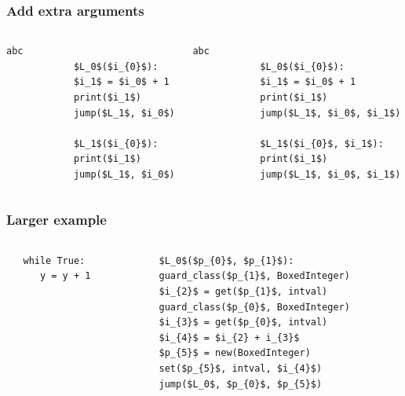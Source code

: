 \documentclass[utf8x]{beamer}
\begin{document}
\begin{frame}[fragile]
  \frametitle{Add extra arguments}
    \begin{columns}
    \begin{column}{0.5\textwidth}
      \centering
            \begin{lstlisting}[mathescape]%,numbers = right,basicstyle=\setstretch{1.05}\ttfamily\scriptsize]
            abc
            $L_0$($i_{0}$):
            $i_1$ = $i_0$ + 1
            print($i_1$)
            jump($L_1$, $i_0$)

            $L_1$($i_{0}$):
            print($i_1$)
            jump($L_1$, $i_0$)
            \end{lstlisting}
    \end{column}
    \pause
    \begin{column}{0.5\textwidth}
      \centering
            \begin{lstlisting}[mathescape]%,numbers = right,basicstyle=\setstretch{1.05}\ttfamily\scriptsize]
            abc
            $L_0$($i_{0}$):
            $i_1$ = $i_0$ + 1
            print($i_1$)
            jump($L_1$, $i_0$, $i_1$)

            $L_1$($i_{0}$, $i_1$):
            print($i_1$)
            jump($L_1$, $i_0$, $i_1$)
            \end{lstlisting}
    \end{column}
  \end{columns}
\end{frame}

\begin{frame}[fragile]
  \frametitle{Larger example}
    \begin{columns}
    \begin{column}{0.5\textwidth}
  \begin{lstlisting}
   while True:
      y = y + 1
  \end{lstlisting}
  \end{column}
    \pause
    \begin{column}{0.5\textwidth}
\begin{lstlisting}[mathescape]
$L_0$($p_{0}$, $p_{1}$):
guard_class($p_{1}$, BoxedInteger)
$i_{2}$ = get($p_{1}$, intval)
guard_class($p_{0}$, BoxedInteger)
$i_{3}$ = get($p_{0}$, intval)
$i_{4}$ = $i_{2} + i_{3}$
$p_{5}$ = new(BoxedInteger)
set($p_{5}$, intval, $i_{4}$)
jump($L_0$, $p_{0}$, $p_{5}$)
\end{lstlisting}
  \end{column}
  \end{columns}
\end{frame}
\end{document}
